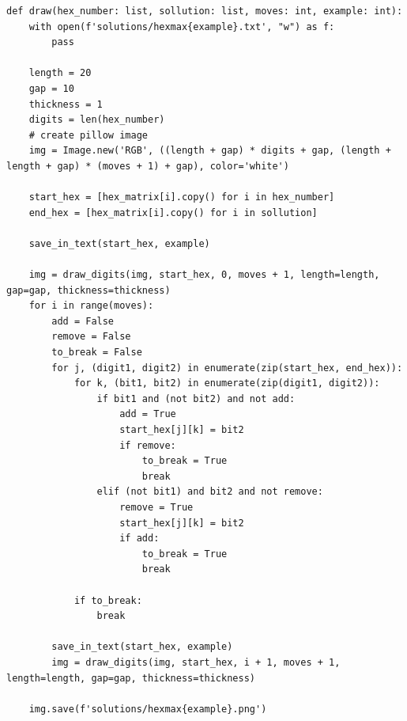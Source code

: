 \documentclass[a4paper,10pt,ngerman]{scrartcl}
\begin{document}
\begin{lstlisting}
def draw(hex_number: list, sollution: list, moves: int, example: int):
    with open(f'solutions/hexmax{example}.txt', "w") as f:
        pass

    length = 20
    gap = 10
    thickness = 1
    digits = len(hex_number)
    # create pillow image
    img = Image.new('RGB', ((length + gap) * digits + gap, (length + length + gap) * (moves + 1) + gap), color='white')

    start_hex = [hex_matrix[i].copy() for i in hex_number]
    end_hex = [hex_matrix[i].copy() for i in sollution]

    save_in_text(start_hex, example)

    img = draw_digits(img, start_hex, 0, moves + 1, length=length, gap=gap, thickness=thickness)
    for i in range(moves):
        add = False
        remove = False
        to_break = False
        for j, (digit1, digit2) in enumerate(zip(start_hex, end_hex)):
            for k, (bit1, bit2) in enumerate(zip(digit1, digit2)):
                if bit1 and (not bit2) and not add:
                    add = True
                    start_hex[j][k] = bit2
                    if remove:
                        to_break = True
                        break
                elif (not bit1) and bit2 and not remove:
                    remove = True
                    start_hex[j][k] = bit2
                    if add:
                        to_break = True
                        break

            if to_break:
                break

        save_in_text(start_hex, example)
        img = draw_digits(img, start_hex, i + 1, moves + 1, length=length, gap=gap, thickness=thickness)

    img.save(f'solutions/hexmax{example}.png')
\end{lstlisting}
\end{document}
